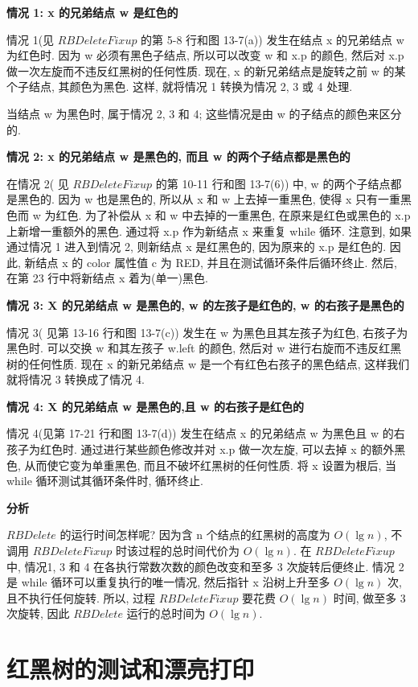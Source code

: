 \documentclass[oneside,10pt,fontset=none]{ctexbook}
\numberwithin{definition}{chapter}
\numberwithin{theorem}{chapter}
\numberwithin{lemma}{chapter}
\begin{document}
\textbf{情况 1: x 的兄弟结点 w 是红色的}

情况 1(见 $RBDeleteFixup$ 的第 5-8 行和图 13-7(a)) 发生在结点 x 的兄弟结点 w 为红色时. 因为 w 必须有黑色子结点, 所以可以改变 w 和 x.p 的颜色, 然后对 x.p 做一次左旋而不违反红黑树的任何性质. 现在, x 的新兄弟结点是旋转之前 w 的某个子结点, 其颜色为黑色. 这样, 就将情况 1 转换为情况 2, 3 或 4 处理.

当结点 w 为黑色时, 属于情况 2, 3 和 4; 这些情况是由 w 的子结点的颜色来区分的.

\textbf{情况 2: x 的兄弟结点 w 是黑色的, 而且 w 的两个子结点都是黑色的}

在情况 2( 见 $RBDeleteFixup$ 的第 10-11 行和图 13-7(6)) 中, w 的两个子结点都是黑色的. 因为 w 也是黑色的, 所以从 x 和 w 上去掉一重黑色, 使得 x 只有一重黑色而 w 为红色. 为了补偿从 x 和 w 中去掉的一重黑色, 在原来是红色或黑色的 x.p 上新增一重额外的黑色. 通过将 x.p 作为新结点 x 来重复 while 循环. 注意到, 如果通过情况 1 进入到情况 2, 则新结点 x 是红黑色的, 因为原来的 x.p 是红色的. 因此, 新结点 x 的 color 属性值 c 为 RED, 并且在测试循环条件后循环终止. 然后, 在第 23 行中将新结点 x 着为(单一)黑色.

\textbf{情况 3: X 的兄弟结点 w 是黑色的, w 的左孩子是红色的, w 的右孩子是黑色的}

情况 3( 见第 13-16 行和图 13-7(c)) 发生在 w 为黑色且其左孩子为红色, 右孩子为黑色时. 可以交换 w 和其左孩子 w.left 的颜色, 然后对 w 进行右旋而不违反红黑树的任何性质. 现在 x 的新兄弟结点 w 是一个有红色右孩子的黑色结点, 这样我们就将情况 3 转换成了情况 4.

\textbf{情况 4: X 的兄弟结点 w 是黑色的,且 w 的右孩子是红色的}

情况 4(见第 17-21 行和图 13-7(d)) 发生在结点 x 的兄弟结点 w 为黑色且 w 的右孩子为红色时. 通过进行某些颜色修改并对 x.p 做一次左旋, 可以去掉 x 的额外黑色, 从而使它变为单重黑色, 而且不破坏红黑树的任何性质. 将 x 设置为根后, 当 while 循环测试其循环条件时, 循环终止.

\textbf{分析}

$RBDelete$ 的运行时间怎样呢? 因为含 n 个结点的红黑树的高度为 $O(\lg n)$, 不调用 $RBDeleteFixup$ 时该过程的总时间代价为 $O(\lg n)$. 在 $RBDeleteFixup$ 中, 情况1, 3 和 4 在各执行常数次数的颜色改变和至多 3 次旋转后便终止. 情况 2 是 while 循环可以重复执行的唯一情况, 然后指针 x 沿树上升至多 $O(\lg n)$ 次, 且不执行任何旋转. 所以, 过程 $RBDeleteFixup$ 要花费 $O(\lg n)$ 时间, 做至多 3 次旋转, 因此 $RBDelete$ 运行的总时间为 $O(\lg{n})$.

\section{红黑树的测试和漂亮打印}
\end{document}
